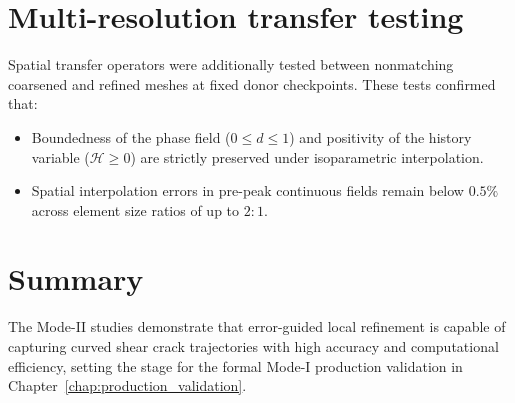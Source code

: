 \section{Multi-resolution transfer testing}
Spatial transfer operators were additionally tested between nonmatching coarsened and refined meshes at fixed donor checkpoints. These tests confirmed that:
\begin{itemize}
  \item Boundedness of the phase field ($0 \le d \le 1$) and positivity of the history variable ($\mathcal{H} \ge 0$) are strictly preserved under isoparametric interpolation.
  \item Spatial interpolation errors in pre-peak continuous fields remain below $0.5\%$ across element size ratios of up to $2:1$.
\end{itemize}

\section{Summary}
The Mode-II studies demonstrate that error-guided local refinement is capable of capturing curved shear crack trajectories with high accuracy and computational efficiency, setting the stage for the formal Mode-I production validation in Chapter~\ref{chap:production_validation}.
